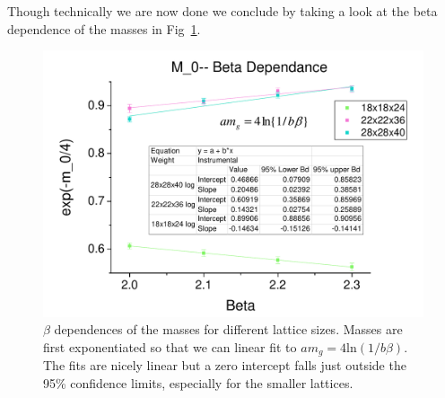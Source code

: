 \documentclass[12pt]{article}
\begin{document}
\par Though technically we are now done we conclude by taking a look at the beta dependence of the masses in Fig~\ref{fig:betadepen}.

\begin{figure}
\centering
\includegraphics[width=\linewidth]{massesdepen.pdf}
\caption{\label{fig:betadepen} $\beta$ dependences of the masses for different lattice sizes. Masses are first exponentiated so that we can linear fit to $am_g = 4\mathrm{ln}(1/b\beta)$. The fits are nicely linear but a zero intercept falls just outside the 95\% confidence limits, especially for the smaller lattices.}
\end{figure}
\end{document}
